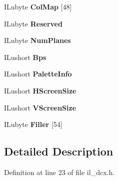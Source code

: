 \begin{DoxyCompactItemize}
\mbox{\label{structDCXHEAD_a3a995e26c9ce954c1ed473f6f5b9643a}} 
I\+Lubyte {\bfseries Col\+Map} \mbox{[}48\mbox{]}
\item 
\mbox{\label{structDCXHEAD_ae97237c24402a00a96e7e409784c86bc}} 
I\+Lubyte {\bfseries Reserved}
\item 
\mbox{\label{structDCXHEAD_a428e77cb107852da30b3da11b0a1784d}} 
I\+Lubyte {\bfseries Num\+Planes}
\item 
\mbox{\label{structDCXHEAD_a5fa048ccf365b538614025a634f51a2b}} 
I\+Lushort {\bfseries Bps}
\item 
\mbox{\label{structDCXHEAD_a4fd719a7548c021f02eab221f4436e15}} 
I\+Lushort {\bfseries Palette\+Info}
\item 
\mbox{\label{structDCXHEAD_a519d95894093fb4b100a62ac387a6e31}} 
I\+Lushort {\bfseries H\+Screen\+Size}
\item 
\mbox{\label{structDCXHEAD_aded0750584329ed76c42d898114e1dea}} 
I\+Lushort {\bfseries V\+Screen\+Size}
\item 
\mbox{\label{structDCXHEAD_ad8505af74d5abf4a8577ade2799b252b}} 
I\+Lubyte {\bfseries Filler} \mbox{[}54\mbox{]}
\end{DoxyCompactItemize}


\subsection{Detailed Description}


Definition at line 23 of file il\+\_\+dcx.\+h.




